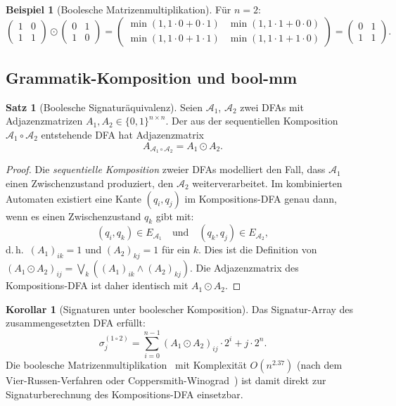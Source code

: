 ﻿\documentclass[a4paper,12pt]{article}
\theoremstyle{definition}
\newtheorem{beispiel}{Beispiel}
\newtheorem{satz}{Satz}
\newtheorem{korollar}{Korollar}
\begin{document}
\begin{beispiel}[Boolesche Matrizenmultiplikation]
F\"ur $n = 2$:
\[
\begin{pmatrix} 1 & 0 \\ 1 & 1 \end{pmatrix}
\odot
\begin{pmatrix} 0 & 1 \\ 1 & 0 \end{pmatrix}
=
\begin{pmatrix}
\min(1, 1\cdot 0 + 0\cdot 1) & \min(1, 1\cdot 1 + 0\cdot 0) \\
\min(1, 1\cdot 0 + 1\cdot 1) & \min(1, 1\cdot 1 + 1\cdot 0)
\end{pmatrix}
=
\begin{pmatrix} 0 & 1 \\ 1 & 1 \end{pmatrix}.
\]
\end{beispiel}

\subsection{Grammatik-Komposition und bool-mm}

\begin{satz}[Boolesche Signatur\"aquivalenz]
\label{satz:boolsig}
Seien $\mathcal{A}_1$, $\mathcal{A}_2$ zwei DFAs mit Adjazenzmatrizen
$A_1, A_2 \in \{0,1\}^{n \times n}$. Der aus der sequentiellen Komposition
$\mathcal{A}_1 \circ \mathcal{A}_2$ entstehende DFA hat Adjazenzmatrix
\[
A_{\mathcal{A}_1 \circ \mathcal{A}_2} = A_1 \odot A_2.
\]
\end{satz}

\begin{proof}
Die \emph{sequentielle Komposition} zweier DFAs modelliert den Fall, dass
$\mathcal{A}_1$ einen Zwischenzustand produziert, den $\mathcal{A}_2$ weiterverarbeitet.
Im kombinierten Automaten existiert eine Kante $(q_i, q_j)$ im Kompositions-DFA
genau dann, wenn es einen Zwischenzustand $q_k$ gibt mit:
\[
(q_i, q_k) \in E_{\mathcal{A}_1} \quad \text{und} \quad
(q_k, q_j) \in E_{\mathcal{A}_2},
\]
d.\,h.\ $(A_1)_{ik} = 1$ und $(A_2)_{kj} = 1$ f\"ur ein $k$.
Dies ist die Definition von $(A_1 \odot A_2)_{ij} = \bigvee_k ((A_1)_{ik} \wedge (A_2)_{kj})$.
Die Adjazenzmatrix des Kompositions-DFA ist daher identisch mit $A_1 \odot A_2$.
\end{proof}

\begin{korollar}[Signaturen unter boolescher Komposition]
Das Signatur-Array des zusammengesetzten DFA erf\"ullt:
\[
\sigma_j^{(1 \circ 2)} = \sum_{i=0}^{n-1} (A_1 \odot A_2)_{ij} \cdot 2^i
+ j \cdot 2^n.
\]
Die boolesche Matrizenmultiplikation~\cite{epp2026boolmm} mit Komplexit\"at
$O(n^{2.37})$ (nach dem Vier-Russen-Verfahren oder Coppersmith-Winograd~\cite{coppersmith1987})
ist damit direkt zur Signaturberechnung des Kompositions-DFA einsetzbar.
\end{korollar}
\end{document}
